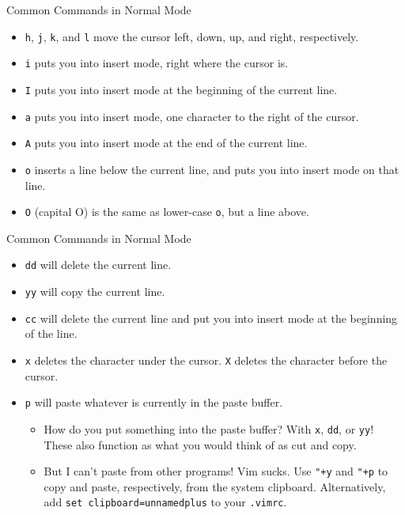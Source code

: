 \documentclass{lug}
\begin{document}
\begin{frame}{Common Commands in Normal Mode}
    \begin{itemize}
        \item \texttt{h}, \texttt{j}, \texttt{k}, and \texttt{l} move the cursor
            left, down, up, and right, respectively.
        \item \texttt{i} puts you into insert mode, right where the cursor is.
        \item \texttt{I} puts you into insert mode at the beginning of the
            current line.
        \item \texttt{a} puts you into insert mode, one character to the right
            of the cursor.
        \item \texttt{A} puts you into insert mode at the end of the current
            line.
        \item \texttt{o} inserts a line below the current line, and puts you
            into insert mode on that line.
        \item \texttt{O} (capital O) is the same as lower-case \texttt{o}, but a
            line above.
    \end{itemize}
\end{frame}

\begin{frame}{Common Commands in Normal Mode}
    \begin{itemize}
        \item \texttt{dd} will delete the current line.
        \item \texttt{yy} will copy the current line.
        \item \texttt{cc} will delete the current line and put you into insert
            mode at the beginning of the line.
        \item \texttt{x} deletes the character under the cursor. \texttt{X}
            deletes the character before the cursor.
        \item \texttt{p} will paste whatever is currently in the paste buffer.
            \begin{itemize}
                \item How do you put something into the paste buffer? With
                    \texttt{x}, \texttt{dd}, or \texttt{yy}! These also function
                    as what you would think of as cut and copy.
                \item But I can't paste from other programs! Vim sucks. Use
                    \texttt{"+y} and \texttt{"+p} to copy and paste,
                    respectively, from the system clipboard. Alternatively, add
                    \texttt{set clipboard=unnamedplus} to your \texttt{.vimrc}.
            \end{itemize}
    \end{itemize}
\end{frame}
\end{document}
